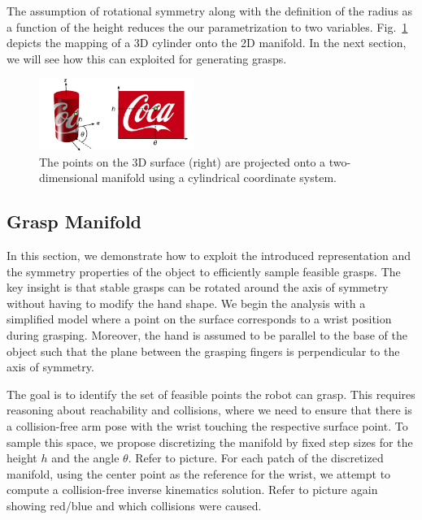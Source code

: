 \documentclass{aamas2015}
\begin{document}
The assumption of rotational symmetry along with the definition of the radius as a function of the
height reduces the our parametrization to two variables. Fig.~\ref{fig:unfolding} depicts the mapping of a 3D
cylinder onto the 2D manifold. In the next section, we will see how this can exploited for
generating grasps.

\begin{figure}[ht!]
  \begin{center}
    \includegraphics[width=0.45\textwidth]{./images/unfolding.pdf} \quad
  \end{center}
  \caption{The points on the 3D surface (right) are projected onto a two-dimensional manifold using a cylindrical coordinate system.}
  \label{fig:unfolding} 
\end{figure}

\subsection{Grasp Manifold}
In this section, we demonstrate how to exploit the introduced representation and the symmetry
properties of the object to efficiently sample feasible grasps. The key insight is that stable
grasps can be rotated around the axis of symmetry without having to modify the hand shape. We begin
the analysis with a simplified model where a point on the surface corresponds to a wrist
position during grasping. Moreover, the hand is assumed to be parallel to the base of the object such that the
plane between the grasping fingers is perpendicular to the axis of symmetry. 

The goal is to identify
the set of feasible points the robot can grasp. This requires reasoning about reachability and
collisions, where we need to ensure that there is a collision-free arm pose with the wrist touching
the respective surface point. To sample this space, we propose discretizing the manifold by fixed
step sizes for the height $h$ and the angle $\theta$. Refer to picture. For each patch of the
discretized manifold, using the center point  as the reference for the wrist, we attempt to compute
a collision-free inverse kinematics solution. Refer to picture again showing red/blue and which
collisions were caused. 
\end{document}
